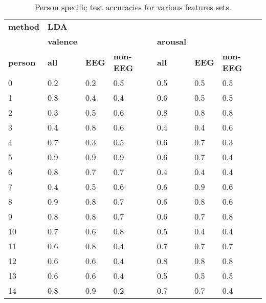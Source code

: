 \begin{table}[]
\centering
\caption{Person specific test accuracies for various features sets.}
\begin{tabular}{l|lll|lll}
\textbf{method}          & \textbf{LDA}                  &           &         &         &     &         \\
                & \textbf{valence}              &           &         & \textbf{arousal} &     &         \\
\textbf{person}          & \textbf{all}                  & \textbf{EEG}       & \textbf{non-EEG} & \textbf{all}     & \textbf{EEG} & \textbf{non-EEG} \\ \hline 
 0               & 0.2                  & 0.2       & 0.5     & 0.5     & 0.5 & 0.5     \\
1               & 0.8                  & 0.4       & 0.4     & 0.6     & 0.5 & 0.5     \\
2               & 0.3                  & 0.5       & 0.6     & 0.8     & 0.8 & 0.8     \\
3               & 0.4                  & 0.8       & 0.6     & 0.4     & 0.4 & 0.6     \\
4               & 0.7                  & 0.3       & 0.5     & 0.6     & 0.7 & 0.3     \\
5               & 0.9                  & 0.9       & 0.9     & 0.6     & 0.7 & 0.4     \\
6               & 0.8                  & 0.7       & 0.7     & 0.4     & 0.4 & 0.4     \\
7               & 0.4                  & 0.5       & 0.6     & 0.6     & 0.9 & 0.6     \\
8               & 0.9                  & 0.8       & 0.7     & 0.6     & 0.8 & 0.6     \\
9               & 0.8                  & 0.8       & 0.7     & 0.6     & 0.7 & 0.8     \\
10              & 0.7                  & 0.6       & 0.8     & 0.5     & 0.4 & 0.4     \\
11              & 0.6                  & 0.8       & 0.4     & 0.7     & 0.7 & 0.7     \\
12              & 0.6                  & 0.6       & 0.4     & 0.8     & 0.8 & 0.8     \\
13              & 0.6                  & 0.6       & 0.4     & 0.5     & 0.5 & 0.5     \\
14              & 0.8                  & 0.9       & 0.2     & 0.7     & 0.7 & 0.4     \\

\end{tabular}
\end{table}
